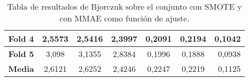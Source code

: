 \begin{table}[H]
{\begin{tabular}{|crrrrrr|}
\multicolumn{1}{|c|}{\textbf{Fold 4}} & \multicolumn{1}{c|}{2,5573}            & \multicolumn{1}{c|}{2,5416}              & \multicolumn{1}{c|}{2,3997}          & \multicolumn{1}{c|}{0,2091}            & \multicolumn{1}{c|}{0,2194}              & 0,1042                             \\ \hline
\multicolumn{1}{|c|}{\textbf{Fold 5}} & \multicolumn{1}{c|}{3,098}             & \multicolumn{1}{c|}{3,1355}              & \multicolumn{1}{c|}{2,8384}          & \multicolumn{1}{c|}{0,1996}            & \multicolumn{1}{c|}{0,1888}              & 0,0938                             \\ \hline
\multicolumn{1}{|c|}{\textbf{Media}}  & \multicolumn{1}{c|}{2,6121}           & \multicolumn{1}{c|}{2,6252}             & \multicolumn{1}{c|}{2,4246}         & \multicolumn{1}{c|}{0,2247}           & \multicolumn{1}{c|}{0,2219}             & 0,1125                             \\ \hline
\end{tabular}%
}
\caption{Tabla de resultados de Bjorczuk sobre el conjunto con SMOTE y con MMAE como función de ajuste.}\label{tablaBJORCZUKconSMOTEconMMAE}
\end{table}



